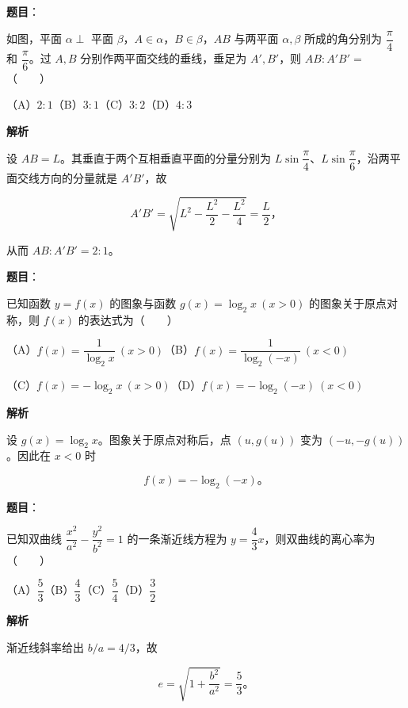 \begin{answer}

\textbf{题目}：

如图，平面 $\alpha\perp$ 平面 $\beta$，$A\in\alpha$，$B\in\beta$，$AB$ 与两平面 $\alpha,\beta$ 所成的角分别为 $\dfrac\pi4$ 和 $\dfrac\pi6$。过 $A,B$ 分别作两平面交线的垂线，垂足为 $A',B'$，则 $AB:A'B'=$\mbox{（　　）}
\nopagebreak[4]
\begin{center}\end{center}
\nopagebreak[4]
（A）$2:1$\quad（B）$3:1$\quad（C）$3:2$\quad（D）$4:3$

\textbf{解析}

设 $AB=L$。其垂直于两个互相垂直平面的分量分别为 $L\sin\dfrac\pi4$、$L\sin\dfrac\pi6$，沿两平面交线方向的分量就是 $A'B'$，故

\nopagebreak[4]
\[
A'B'=\sqrt{L^2-\frac{L^2}{2}-\frac{L^2}{4}}=\frac L2\text{，}
\]

从而 $AB:A'B'=2:1$。


\end{answer}
\begin{answer}

\textbf{题目}：

已知函数 $y=f(x)$ 的图象与函数 $g(x)=\log_2x\ (x>0)$ 的图象关于原点对称，则 $f(x)$ 的表达式为\mbox{（　　）}

（A）$f(x)=\dfrac1{\log_2x}\ (x>0)$\quad（B）$f(x)=\dfrac1{\log_2(-x)}\ (x<0)$

（C）$f(x)=-\log_2x\ (x>0)$\quad（D）$f(x)=-\log_2(-x)\ (x<0)$

\textbf{解析}

设 $g(x)=\log_2x$。图象关于原点对称后，点 $(u,g(u))$ 变为 $(-u,-g(u))$。因此在 $x<0$ 时

\nopagebreak[4]
\[
f(x)=-\log_2(-x)\text{。}
\]


\end{answer}
\begin{answer}

\textbf{题目}：

已知双曲线 $\dfrac{x^2}{a^2}-\dfrac{y^2}{b^2}=1$ 的一条渐近线方程为 $y=\dfrac43x$，则双曲线的离心率为\mbox{（　　）}

（A）$\dfrac53$\quad（B）$\dfrac43$\quad（C）$\dfrac54$\quad（D）$\dfrac32$

\textbf{解析}

渐近线斜率给出 $b/a=4/3$，故

\nopagebreak[4]
\[
e=\sqrt{1+\frac{b^2}{a^2}}=\frac53\text{。}
\]


\end{answer}
